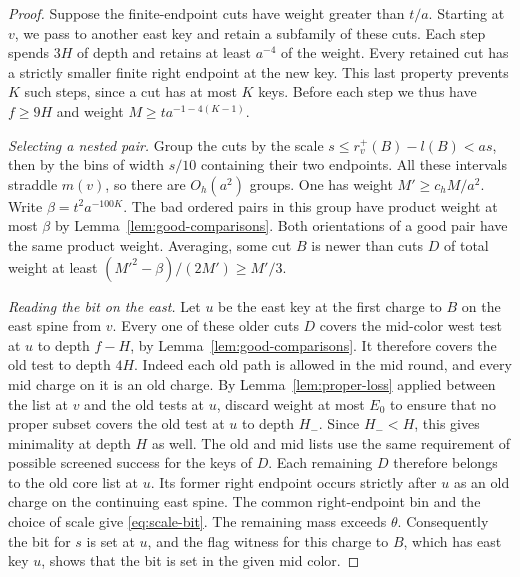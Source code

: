 \begin{proof}
Suppose the finite-endpoint cuts have weight greater than \(t/a\).
Starting at \(v\), we pass to another east key and retain a subfamily
of these cuts. Each step spends \(3H\) of depth and retains at least
\(a^{-4}\) of the weight. Every retained cut has a strictly smaller
finite right endpoint at the new key. This last property prevents
\(K\) such steps, since a cut has at most \(K\) keys.
Before each step we thus have \(f\ge9H\) and weight
\(M\ge t a^{-1-4(K-1)}\).

\emph{Selecting a nested pair.}
Group the cuts by the scale \(s\le r_v^+(B)-l(B)<as\), then by
the bins of width \(s/10\) containing their two endpoints. All these
intervals straddle \(m(v)\), so there are \(O_h(a^2)\) groups. One has
weight \(M'\ge c_h M/a^2\). Write \(\beta=t^2a^{-100K}\). The
bad ordered pairs in this group have product weight at most \(\beta\)
by Lemma~\ref{lem:good-comparisons}. Both orientations of a good
pair have the same product weight. Averaging, some cut \(B\) is
newer than cuts \(D\) of total weight at least
\((M'^2-\beta)/(2M')\ge M'/3\).

\emph{Reading the bit on the east.}
Let \(u\) be the east key at the first charge to \(B\) on the east
spine from \(v\). Every one of these older cuts \(D\) covers the
mid-color west test at \(u\) to depth \(f-H\), by
Lemma~\ref{lem:good-comparisons}. It therefore covers the old test
to depth \(4H\). Indeed each old path is allowed in the mid round,
and every mid charge on it is an old charge. By
Lemma~\ref{lem:proper-loss} applied between the list at \(v\) and the
old tests at \(u\), discard weight at most \(E_0\) to ensure
that no proper subset covers the old test at \(u\) to depth \(H_-\).
Since \(H_-<H\), this gives minimality at depth \(H\) as well. The
old and mid lists use the same requirement of possible screened
success for the keys of \(D\). Each remaining \(D\) therefore belongs
to the old core list at \(u\). Its former right endpoint occurs strictly
after \(u\) as an old charge on the continuing east spine. The common
right-endpoint bin and the choice of scale give
\eqref{eq:scale-bit}. The remaining mass exceeds \(\theta\).
Consequently the bit for \(s\) is set at \(u\), and the flag witness
for this charge to \(B\), which has east key \(u\), shows that the
bit is set in the given mid color.


\end{proof}

